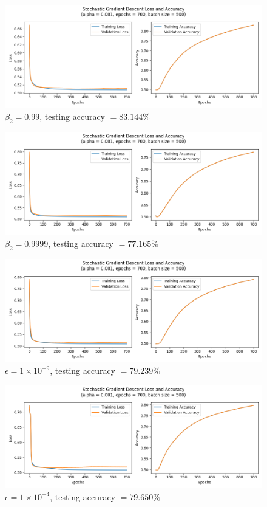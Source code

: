 \documentclass[letter]{article}
\begin{document}
\begin{figure}[H]
	\centering
	\includegraphics[width=\linewidth]{Figure_13}
	\caption{$\beta_2 = 0.99$, testing accuracy $ = 83.144\%$}
	\label{fig:plot13}
\end{figure}

\begin{figure}[H]
	\centering
	\includegraphics[width=\linewidth]{Figure_14}
	\caption{$\beta_2 = 0.9999$, testing accuracy $ = 77.165\%$}
	\label{fig:plot14}
\end{figure}

\begin{figure}[H]
	\centering
	\includegraphics[width=\linewidth]{Figure_15}
	\caption{$\epsilon = 1 \times 10^{-9}$, testing accuracy $ = 79.239\%$}
	\label{fig:plot15}
\end{figure}

\begin{figure}[H]
	\centering
	\includegraphics[width=\linewidth]{Figure_16}
	\caption{$\epsilon = 1 \times 10^{-4}$, testing accuracy $ = 79.650\%$}
	\label{fig:plot16}
\end{figure}
\end{document}
